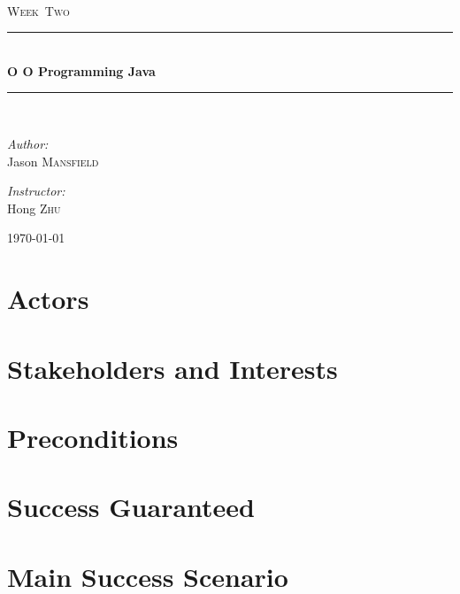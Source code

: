 \documentclass[11pt,a4paper]{article}
\newcommand{\HRule}{\rule{\linewidth}{0.5mm}}
\begin{document}
%
\begin{titlepage}
\begin{center}


\textsc{\color{Sepia}{\LARGE CS~434}}\\[1.5cm]
\textsc{\Large Week~Two}\\[0.5cm]
\HRule \\[0.4cm]
{ \huge \bfseries O O Programming Java}\\[0.4cm]
\HRule \\[1.5cm]


\begin{minipage}{0.4\textwidth}
\begin{flushleft} \large
\emph{Author:}\\
Jason \textsc{Mansfield}
\end{flushleft}
\end{minipage}
\begin{minipage}{0.4\textwidth}
\begin{flushright} \large
\emph{Instructor:} \\
Hong \textsc{Zhu}
\end{flushright}
\end{minipage}
\vfill
{\large \today}
\end{center}
\end{titlepage}
\tableofcontents
\section{Actors}
\section{Stakeholders and Interests}
\section{Preconditions}
\section{Success Guaranteed}
\section{Main Success Scenario}
\end{document}
